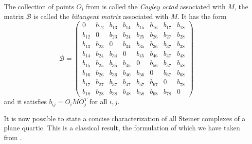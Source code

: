 \documentclass[a4paper,10pt]{amsart}
\theoremstyle{definition}
\theoremstyle{plain}
\newcommand{\cB}{{\mathcal B}}
\begin{document}
The collection of points $O_i$ from  is called the \emph{Cayley octad} associated with $M$, the matrix $\cB$ is called the \emph{bitangent matrix} associated with $M$. It has the form
\begin{equation*}
    \cB = \begin{pmatrix}
        0 & b_{12} & b_{13} & b_{14} & b_{15} & b_{16} & b_{17} & b_{18} \\
        b_{12} & 0 & b_{23} & b_{24} & b_{25} & b_{26} & b_{27} & b_{28} \\
        b_{13} & b_{23} & 0 & b_{34} & b_{35} & b_{36} & b_{37} & b_{38} \\
        b_{14} & b_{24} & b_{34} & 0 & b_{45} & b_{46} & b_{47} & b_{48} \\
        b_{15} & b_{25} & b_{35} & b_{45} & 0 & b_{56} & b_{57} & b_{58} \\
        b_{16} & b_{26} & b_{36} & b_{46} & b_{56} & 0 &  b_{67} & b_{68} \\
        b_{17} & b_{27} & b_{37} & b_{47} & b_{57} & b_{67} & 0 & b_{78} \\
        b_{18} &  b_{28} & b_{38} & b_{48} & b_{58} & b_{68} & b_{78} & 0
    \end{pmatrix}
\end{equation*}
and it satisfies $b_{ij} = O_iMO_j^T$ for all $i,j$.

It is now possible to state a concise characterization of all Steiner complexes of a plane quartic. This is a classical result, the formulation of which we have taken from \cite[Theorem 5.10]{plaumann}.
\end{document}
